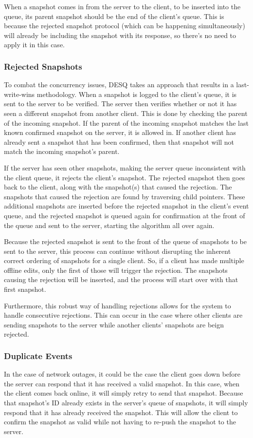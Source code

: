 When a snapshot comes in from the server to the client, to be inserted into the queue, its parent snapshot should be the end of the client's queue. This is because the rejected snapshot protocol (which can be happening simultaneously) will already be including the snapshot with its response, so there's no need to apply it in this case. 

\subsubsection{Rejected Snapshots}

To combat the concurrency issues, DESQ takes an approach that results in a last-write-wins methodology. When a snapshot is logged to the client's queue, it is sent to the server to be verified. The server then verifies whether or not it has seen a different snapshot from another client. This is done by checking the parent of the incoming snapshot. If the parent of the incoming snapshot matches the last known confirmed snapshot on the server, it is allowed in. If another client has already sent a snapshot that has been confirmed, then that snapshot will not match the incoming snapshot's parent.

If the server has seen other snapshots, making the server queue inconsistent with the client queue, it rejects the client's snapshot. The rejected snapshot then goes back to the client, along with the snapshot(s) that caused the rejection. The snapshots that caused the rejection are found by traversing child pointers. These additional snapshots are inserted before the rejected snapshot in the client's event queue, and the rejected snapshot is queued again for confirmation at the front of the queue and sent to the server, starting the algorithm all over again. 

Because the rejected snapshot is sent to the front of the queue of snapshots to be sent to the server, this process can continue without disrupting the inherent correct ordering of snapshots for a single client. So, if a client has made multiple offline edits, only the first of those will trigger the rejection. The snapshots causing the rejection will be inserted, and the process will start over with that first snapshot.

Furthermore, this robust way of handling rejections allows for the system to handle consecutive rejections. This can occur in the case where other clients are sending snapshots to the server while another clients' snapshots are beign rejected.

\subsubsection{Duplicate Events}

In the case of network outages, it could be the case the client goes down before the server can respond that it has received a valid snapshot. In this case, when the client comes back online, it will simply retry to send that snapshot. Because that snapshot's ID already exists in the server's queue of snapshots, it will simply respond that it has already received the snapshot. This will allow the client to confirm the snapshot as valid while not having to re-push the snapshot to the server.